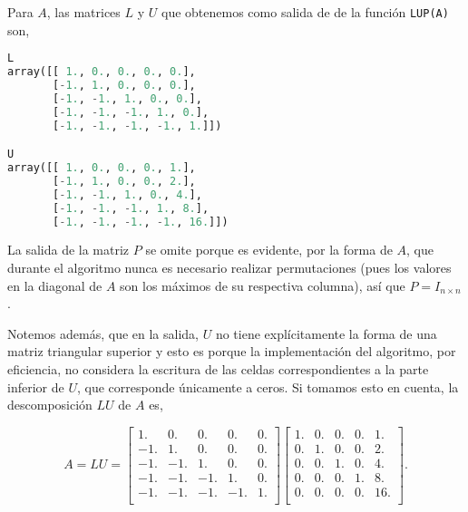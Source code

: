 \documentclass{article}
\begin{document}
\begin{enumerate}
    Para $A$, las matrices $L$ y $U$ que obtenemos como salida de de la función \texttt{LUP(A)}  son,

\begin{lstlisting}[language=Python]
L
array([[ 1., 0., 0., 0., 0.],
       [-1., 1., 0., 0., 0.],
       [-1., -1., 1., 0., 0.],
       [-1., -1., -1., 1., 0.],
       [-1., -1., -1., -1., 1.]])

U
array([[ 1., 0., 0., 0., 1.],
       [-1., 1., 0., 0., 2.],
       [-1., -1., 1., 0., 4.],
       [-1., -1., -1., 1., 8.],
       [-1., -1., -1., -1., 16.]])
\end{lstlisting}

    La salida de la matriz $P$ se omite porque es evidente, por la forma de $A$, que
    durante el algoritmo nunca es necesario realizar permutaciones (pues los valores
    en la diagonal de $A$ son los máximos de su respectiva columna), así que $P=I_{n\times n}$.

    Notemos además, que en la salida, $U$ no tiene explícitamente la forma de una matriz
    triangular superior y esto es porque la implementación del algoritmo, por eficiencia,
    no considera la escritura de las celdas correspondientes a la parte inferior de $U$,
    que corresponde únicamente a ceros. Si tomamos esto en cuenta, la descomposición $LU$
    de $A$ es,

    \begin{equation*}
        A = LU = \begin{bmatrix}
            1. & 0. & 0. & 0. & 0.\\
            -1. & 1. & 0. & 0. & 0.\\
            -1. & -1. & 1. & 0. & 0.\\
            -1. & -1. & -1. & 1. & 0.\\
            -1. & -1. & -1. & -1. & 1.\\
          \end{bmatrix} \begin{bmatrix}
            1. & 0. & 0. & 0. & 1.\\
            0. & 1. & 0. & 0. & 2.\\
            0. & 0. & 1. & 0. & 4.\\
            0. & 0. & 0. & 1. & 8.\\
            0. & 0. & 0. & 0. & 16.\\
          \end{bmatrix}.
    \end{equation*}


\end{enumerate}
\end{document}
